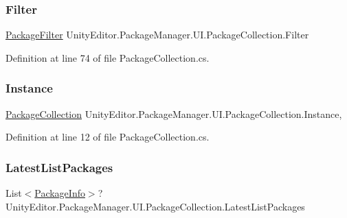 \subsubsection{\texorpdfstring{Filter}{Filter}}
{\footnotesize\ttfamily \mbox{\hyperlink{namespace_unity_editor_1_1_package_manager_1_1_u_i_aec89f744729646d8e261787be78942c8}{Package\+Filter}} Unity\+Editor.\+Package\+Manager.\+U\+I.\+Package\+Collection.\+Filter\hspace{0.3cm}{\ttfamily [get]}}



Definition at line 74 of file Package\+Collection.\+cs.

\mbox{\label{class_unity_editor_1_1_package_manager_1_1_u_i_1_1_package_collection_a75a698a6c798e48fbddf0e7edbf6db71}} 
\subsubsection{\texorpdfstring{Instance}{Instance}}
{\footnotesize\ttfamily \mbox{\hyperlink{class_unity_editor_1_1_package_manager_1_1_u_i_1_1_package_collection}{Package\+Collection}} Unity\+Editor.\+Package\+Manager.\+U\+I.\+Package\+Collection.\+Instance\hspace{0.3cm}{\ttfamily [static]}, {\ttfamily [get]}}



Definition at line 12 of file Package\+Collection.\+cs.

\mbox{\label{class_unity_editor_1_1_package_manager_1_1_u_i_1_1_package_collection_aecaff6ca4f7866ee058b7c70d3aa49bc}} 
\subsubsection{\texorpdfstring{LatestListPackages}{LatestListPackages}}
{\footnotesize\ttfamily List$<$\mbox{\hyperlink{class_unity_editor_1_1_package_manager_1_1_u_i_1_1_package_info}{Package\+Info}}$>$? Unity\+Editor.\+Package\+Manager.\+U\+I.\+Package\+Collection.\+Latest\+List\+Packages\hspace{0.3cm}{\ttfamily [get]}}



